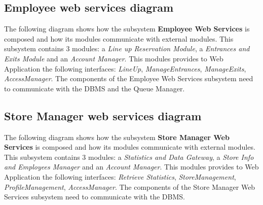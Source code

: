 
\subsection{Employee web services diagram}

    The following diagram shows how the subsystem \textbf{Employee Web Services} is composed and how its modules communicate with external modules. This subsystem contains 3 modules: a \textit{Line up Reservation Module}, a \textit{Entrances and Exits Module} and an \textit{Account Manager}. This modules provides to Web Application the following interfaces: \textit{LineUp}, \textit{ManageEntrances}, \textit{ManageExits}, \textit{AccessManager}. The components of the Employee Web Services subsystem need to communicate with the DBMS and the Queue Manager.


\subsection{Store Manager web services diagram}

    The following diagram shows how the subsystem \textbf{Store Manager Web Services} is composed and how its modules communicate with external modules. This subsystem contains 3 modules: a \textit{Statistics and Data Gateway}, a \textit{Store Info and Employees Manager} and an \textit{Account Manager}. This modules provides to Web Application the following interfaces: \textit{Retrieve Statistics}, \textit{StoreManagement}, \textit{ProfileManagement}, \textit{AccessManager}. The components of the Store Manager Web Services subsystem need to communicate with the DBMS.

